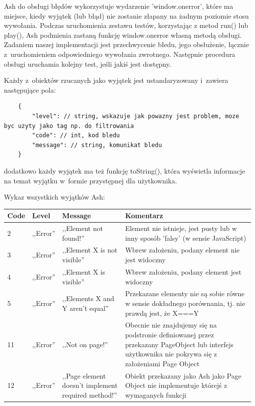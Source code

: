 \documentclass[brudnopis]{xmgr}
\begin{document}
Ash do obsługi błędów wykorzystuje wydarzenie 'window.onerror', które ma miejsce, kiedy wyjątek (lub błąd) nie zostanie złapany na żadnym poziomie stosu wywołania. Podczas uruchomienia zestawu testów, korzystając z metod run() lub play(), Ash podmienia zastaną funkcję window.onerror własną metodą obsługi. Zadaniem naszej implementacji jest przechwycenie błedu, jego obsłużenie, łącznie z~uruchomieniem odpowiedniego wywołania zwrotnego. Następnie procedura obsługi uruchamia kolejny test, jeśli jakiś jest dostępny. 

Każdy z~obiektów rzucanych jako wyjątek jest ustandaryzowany i~zawiera następujące pola: 

\begin{lstlisting}
	{
		"level": // string, wskazuje jak powazny jest problem, moze byc uzyty jako tag np. do filtrowania 
		"code": // int, kod bledu
		"message": // string, komunikat bledu 
	}
\end{lstlisting}

dodatkowo każdy wyjątek ma też funkcję toString(), która wyświetla informacje na temat wyjątku w~formie przystępnej dla użytkownika.

Wykaz wszystkich wyjątków Ash:

\begin{center}
    \begin{tabularx}{\textwidth}{ | p{1cm} | p{2cm} | X | X |}
    \hline
    Code & Level & Message & Komentarz \\ \hline
    2 & ,,Error'' & ,,Element not found!'' & Element nie istnieje, jest pusty lub w inny sposób 'falsy' (w sensie JavaScript)  \\ \hline
    3 & ,,Error'' & ,,Element X is not visible'' & Wbrew założeniu, podany element nie jest widoczny  \\ \hline
    4 & ,,Error'' & ,,Element X is visible'' & Wbrew założeniu, podany element jest widoczny  \\ \hline
    5 & ,,Error'' & ,,Elements X and Y aren't equal'' & Przekazane elementy nie są sobie równe w sensie dokładnego porównania, tj.  nie prawdą jest, że X===Y  \\ \hline
    11 & ,,Error'' & ,,Not on page!'' & Obecnie nie znajdujemy się na podstronie definiowanej przez przekazany PageObject lub interfejs użytkownika nie pokrywa się z założeniami Page Object  \\ \hline
    12 & ,,Error'' & ,,Page element doesn't implement required method!'' & Obiekt przekazany jako Ash jako Page Object nie implementuje którejś z wymaganych funkcji  \\ \hline
    \end{tabularx}
\end{center}
\end{document}
